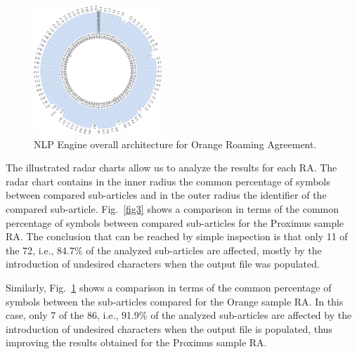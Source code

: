 \begin{figure}[htbp]
\centerline{\includegraphics[width=0.43\textwidth]{images/Orange.png}}
\caption{NLP Engine overall architecture for Orange Roaming Agreement.}
\label{fig4}
\end{figure}

The illustrated radar charts allow us to analyze the results for each RA. The radar chart contains in the inner radius the common percentage of symbols between compared sub-articles and in the outer radius the identifier of the compared sub-article. Fig.~\ref{fig3} shows a comparison in terms of the common percentage of symbols between compared sub-articles for the Proximus sample RA. The conclusion that can be reached by simple inspection is that only 11 of the 72, i.e.,  84.7\% of the analyzed sub-articles are affected, mostly by the introduction of undesired characters when the output file was populated.

Similarly, Fig.~\ref{fig4} shows a comparison in terms of the common percentage of symbols between the sub-articles compared for the Orange sample RA. In this case, only 7 of the 86, i.e., 91.9\% of the analyzed sub-articles are affected by the introduction of undesired characters when the output file is populated, thus improving the results obtained for the Proximus sample RA.


